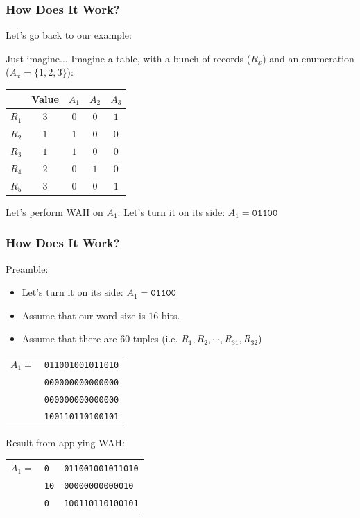 \documentclass[11pt]{beamer}
\begin{document}
\begin{frame}
	\frametitle{How Does It Work?}
	
	Let's go back to our example:
	\begin{exampleblock}{Just imagine...}
		Imagine a table, with a bunch of records ($R_x$) and an enumeration ($A_x = \{1, 2, 3\}$):
	
		\begin{tabular}{r|c|c|c|c}
				& \textbf{Value} & $A_1$ & $A_2$ & $A_3$ \\ \hline
			$R_1$ & $3$	& $0$	& $0$	& $1$ \\
			$R_2$ & $1$	& $1$	& $0$	& $0$ \\
			$R_3$ & $1$	& $1$	& $0$	& $0$ \\
			$R_4$ & $2$	& $0$	& $1$	& $0$ \\
			$R_5$ & $3$	& $0$	& $0$	& $1$ 
		\end{tabular}
	\end{exampleblock}

	\pause
	Let's perform WAH on $A_1$. \pause Let's turn it on its side: $A_1 = \texttt{01100}$
\end{frame}

\begin{frame}
	\frametitle{How Does It Work?}
	
	Preamble:
	\begin{itemize}
		\item Let's turn it on its side: $A_1 = \texttt{01100}$
		\item Assume that our word size is $16$ bits.
		\item Assume that there are $60$ tuples (i.e. $R_1, R_2, \dotsm, R_{31}, R_{32}$)
	\end{itemize}
	
	\pause
	\begin{tabular}{rl}
		$A_1 =$	& \texttt{011001001011010} \\
				& \texttt{000000000000000} \\
				& \texttt{000000000000000} \\
				& \texttt{100110110100101}
	\end{tabular}
	
	\pause
	Result from applying WAH: \\
	\begin{tabular}{rll}
		$A_1 =$	& \texttt{0} 	& \texttt{011001001011010} \\
				& \texttt{10} 	& \texttt{00000000000010} \\
				& \texttt{0} 	& \texttt{100110110100101}
	\end{tabular}
\end{frame}
\end{document}
